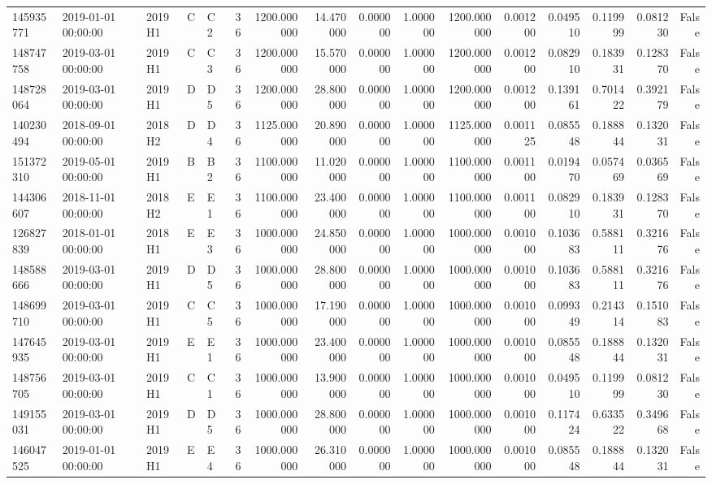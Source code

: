 \begin{tabular}{lllllrrrrrrrrrrr}
145935771 & 2019-01-01 00:00:00 & 2019H1 & C & C2 & 36 & 1200.000000 & 14.470000 & 0.000000 & 1.000000 & 1200.000000 & 0.001200 & 0.049510 & 0.119999 & 0.081230 & False \\
148747758 & 2019-03-01 00:00:00 & 2019H1 & C & C3 & 36 & 1200.000000 & 15.570000 & 0.000000 & 1.000000 & 1200.000000 & 0.001200 & 0.082910 & 0.183931 & 0.128370 & False \\
148728064 & 2019-03-01 00:00:00 & 2019H1 & D & D5 & 36 & 1200.000000 & 28.800000 & 0.000000 & 1.000000 & 1200.000000 & 0.001200 & 0.139161 & 0.701422 & 0.392179 & False \\
140230494 & 2018-09-01 00:00:00 & 2018H2 & D & D4 & 36 & 1125.000000 & 20.890000 & 0.000000 & 1.000000 & 1125.000000 & 0.001125 & 0.085548 & 0.188844 & 0.132031 & False \\
151372310 & 2019-05-01 00:00:00 & 2019H1 & B & B2 & 36 & 1100.000000 & 11.020000 & 0.000000 & 1.000000 & 1100.000000 & 0.001100 & 0.019470 & 0.057469 & 0.036569 & False \\
144306607 & 2018-11-01 00:00:00 & 2018H2 & E & E1 & 36 & 1100.000000 & 23.400000 & 0.000000 & 1.000000 & 1100.000000 & 0.001100 & 0.082910 & 0.183931 & 0.128370 & False \\
126827839 & 2018-01-01 00:00:00 & 2018H1 & E & E3 & 36 & 1000.000000 & 24.850000 & 0.000000 & 1.000000 & 1000.000000 & 0.001000 & 0.103683 & 0.588111 & 0.321676 & False \\
148588666 & 2019-03-01 00:00:00 & 2019H1 & D & D5 & 36 & 1000.000000 & 28.800000 & 0.000000 & 1.000000 & 1000.000000 & 0.001000 & 0.103683 & 0.588111 & 0.321676 & False \\
148699710 & 2019-03-01 00:00:00 & 2019H1 & C & C5 & 36 & 1000.000000 & 17.190000 & 0.000000 & 1.000000 & 1000.000000 & 0.001000 & 0.099349 & 0.214314 & 0.151083 & False \\
147645935 & 2019-03-01 00:00:00 & 2019H1 & E & E1 & 36 & 1000.000000 & 23.400000 & 0.000000 & 1.000000 & 1000.000000 & 0.001000 & 0.085548 & 0.188844 & 0.132031 & False \\
148756705 & 2019-03-01 00:00:00 & 2019H1 & C & C1 & 36 & 1000.000000 & 13.900000 & 0.000000 & 1.000000 & 1000.000000 & 0.001000 & 0.049510 & 0.119999 & 0.081230 & False \\
149155031 & 2019-03-01 00:00:00 & 2019H1 & D & D5 & 36 & 1000.000000 & 28.800000 & 0.000000 & 1.000000 & 1000.000000 & 0.001000 & 0.117424 & 0.633522 & 0.349668 & False \\
146047525 & 2019-01-01 00:00:00 & 2019H1 & E & E4 & 36 & 1000.000000 & 26.310000 & 0.000000 & 1.000000 & 1000.000000 & 0.001000 & 0.085548 & 0.188844 & 0.132031 & False \\

\end{tabular}
